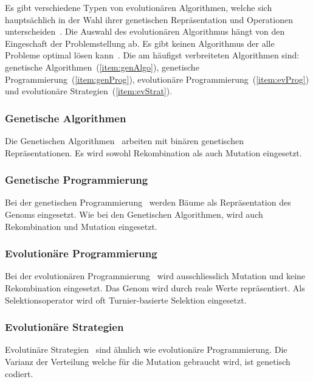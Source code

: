     Es gibt verschiedene Typen von evolutionären Algorithmen, welche sich hauptsächlich in der Wahl ihrer genetischen Repräsentation
    und Operationen unterscheiden~\cite{book:introEvComp}.
    Die Auswahl des evolutionären Algorithmus hängt von den Eingeschaft der Problemstellung ab.
    Es gibt keinen Algorithmus der alle Probleme optimal lösen kann~\cite{book:genAlgoDataStructsEvProg}.
    Die am häufigst verbreiteten Algorithmen sind: genetische Algorithmen~(\vref{item:genAlgo}),
    genetische Programmierung~(\vref{item:genProg}), evolutionäre Programmierung~(\vref{item:evProg})
    und evolutionäre Strategien~(\vref{item:evStrat}).

    \subsubsection{Genetische Algorithmen\label{item:genAlgo}}

      Die Genetischen Algorithmen~\cite{book:adapNaturalArtSys} arbeiten mit binären genetischen Repräsentationen.
      Es wird sowohl Rekombination als auch Mutation eingesetzt.

    \subsubsection{Genetische Programmierung\label{item:genProg}}

      Bei der genetischen Programmierung~\cite{book:genProg} werden Bäume als Repräsentation des Genoms eingesetzt. Wie bei den Genetischen Algorithmen,
      wird auch Rekombination und Mutation eingesetzt.

    \subsubsection{Evolutionäre Programmierung\label{item:evProg}}

      Bei der evolutionären Programmierung~\cite{book:artIntSimEv} wird ausschliesslich Mutation und keine Rekombination eingesetzt.
      Das Genom wird durch reale Werte repräsentiert. Als Selektionsoperator wird oft Turnier-basierte Selektion eingesetzt.

    \subsubsection{Evolutionäre Strategien\label{item:evStrat}}

      Evolutinäre Strategien~\cite{book:evStrat} sind ähnlich wie evolutionäre Programmierung.
      Die Varianz der Verteilung welche für die Mutation gebraucht wird, ist genetisch codiert.
